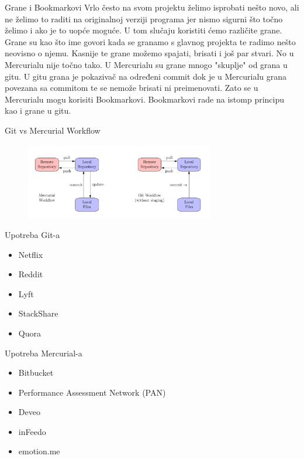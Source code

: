 \documentclass{beamer}
\begin{document}
\begin{frame}{Grane i Bookmarkovi}
Vrlo često na svom projektu želimo isprobati nešto novo, ali ne želimo to raditi na originalnoj verziji programa jer nismo sigurni što točno želimo i ako je to uopće moguće. U tom slučaju koristiti ćemo različite grane. Grane su kao što ime govori kada se granamo s glavnog projekta te radimo nešto neovisno o njemu. Kasnije te grane možemo spajati, brisati i još par stvari. No u Mercurialu nije točno tako. U Mercurialu su grane mnogo "skuplje" od grana u gitu. U gitu grana je pokazivač na određeni commit dok je u Mercurialu grana povezana sa commitom te se nemože brisati ni preimenovati. Zato se u Mercurialu mogu korisiti Bookmarkovi. Bookmarkovi rade na istomp principu kao i grane u gitu.
\end{frame}

\begin{frame}{Git vs Mercurial Workflow}
\begin{figure}
    \centering
    \includegraphics[width = 310px]{workflows.png}
    \label{fig:my_label}
\end{figure}
\end{frame}

\begin{frame}{Upotreba Git-a}
\begin{itemize}
    \item Netflix
    \item Reddit 
    \item Lyft
    \item StackShare
    \item Quora
\end{itemize}
\end{frame}

\begin{frame}{Upotreba Mercurial-a}
\begin{itemize}
    \item Bitbucket
    \item Performance Assessment Network (PAN)
    \item Deveo
    \item inFeedo
    \item emotion.me
\end{itemize}
\end{frame}
\end{document}
